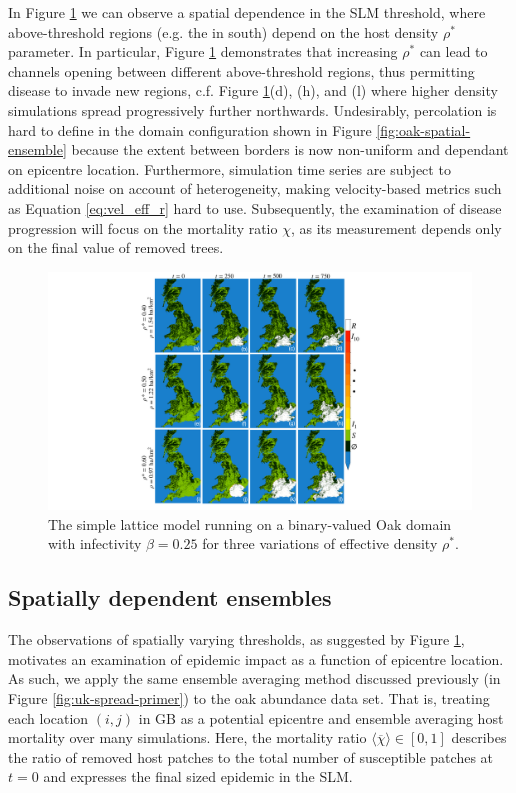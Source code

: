 In Figure \ref{fig:ch4_uk_spread} we can observe a spatial dependence in the SLM threshold,
where above-threshold regions (e.g. the in south) depend on the host density $\rho^*$ parameter.
In particular, Figure \ref{fig:ch4_uk_spread} demonstrates that increasing $\rho^*$ can lead to channels opening between different above-threshold regions, thus permitting disease to invade new regions, c.f. Figure \ref{fig:ch4_uk_spread}(d), (h), and (l) where higher density simulations spread progressively further northwards.
Undesirably, percolation is hard to define in the domain configuration shown in 
Figure \ref{fig:oak-spatial-ensemble} because the extent between borders is now non-uniform
and dependant on epicentre location.
Furthermore, simulation time series are subject to additional noise on account of heterogeneity, 
making velocity-based metrics such as Equation \ref{eq:vel_eff_r} hard to use. 
Subsequently, the examination of disease progression will focus on the mortality ratio $\chi$, 
as its measurement depends only on the final value of removed trees.

\begin{figure}
    \centering
    \includegraphics[scale=0.490]{chapter4/figures/figure4.pdf}
    \caption{The simple lattice model running on a binary-valued Oak domain with infectivity $\beta=0.25$ for three variations of effective density $\rho^*$.}
    \label{fig:ch4_uk_spread}
\end{figure}

\subsection{Spatially dependent ensembles}
\label{sec:slm-spatial-ensembles}

The observations of spatially varying thresholds, as suggested by Figure \ref{fig:ch4_uk_spread}, 
motivates an examination of epidemic impact as a function of epicentre location.
As such, we apply the same ensemble averaging method discussed previously (in Figure \ref{fig:uk-spread-primer})
to the oak abundance data set. That is, treating each location $(i,j)$ in GB as a potential
epicentre and ensemble averaging host mortality over many simulations.
Here, the mortality ratio $\big\langle \overline{\chi} \big\rangle \in [0, 1]$ describes the ratio 
of removed host patches to the total number of susceptible patches at $t=0$ and 
expresses the final sized epidemic in the SLM. 

